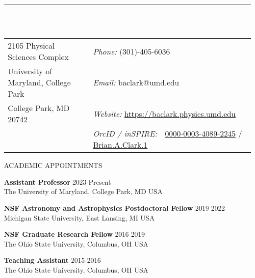 \documentclass{resume} %
\begin{document}

\vspace{-1cm}
\rule{\textwidth}{0.1cm} \\ \\
\begin{tabular}{@{}p{2.5in}p{4in}}
2105 Physical Sciences Complex            & {\it Phone:}  (301)-405-6036 \\            
University of Maryland, College Park  & {\it Email:}  baclark@umd.edu
 \\         
College Park, MD 20742   & {\it Website:} \url{https://baclark.physics.umd.edu} \\       
   & {\it OrcID / inSPIRE:} \,\,      \href{https://orcid.org/0000-0003-4089-2245}{0000-0003-4089-2245}  / \href{https://inspirehep.net/author/profile/Brian.A.Clark.1}{Brian.A.Clark.1}\\     
\end{tabular}





\begin{rSection}{ACADEMIC APPOINTMENTS}

\textbf{Assistant Professor} \hfill 2023-Present \\ The University of Maryland, College Park, MD USA 

\textbf{NSF Astronomy and Astrophysics Postdoctoral Fellow} \hfill 2019-2022 \\ Michigan State University, East Lansing, MI USA 

\textbf{NSF Graduate Research Fellow} \hfill 2016-2019 \\ The Ohio State University, Columbus, OH USA 

\textbf{Teaching Assistant} \hfill 2015-2016 \\ The Ohio State University, Columbus, OH USA 


\end{rSection}
\end{document}
